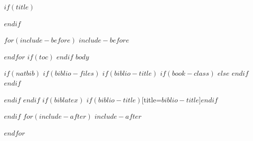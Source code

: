 \documentclass[a4paper,11pt]{article}
\newcommand\titlefont{\rm\huge\sffamily\nohang}
\begin{document}
\thispagestyle{empty}
$if(title)$
\begin{center}

\vspace{1em}
{\titlefont{$title$}}

\vspace{2em}
{\large{}}

\vspace{1em}
\end{center}
$endif$

$for(include-before)$
$include-before$

$endfor$
$if(toc)$
{
\hypersetup{linkcolor=black}
\setcounter{tocdepth}{$toc-depth$}
\tableofcontents
}
$endif$
$body$

$if(natbib)$
$if(biblio-files)$
$if(biblio-title)$
$if(book-class)$
\renewcommand\bibname{$biblio-title$}
$else$
\renewcommand\refname{$biblio-title$}
$endif$
$endif$


$endif$
$endif$
$if(biblatex)$
\printbibliography$if(biblio-title)$[title=$biblio-title$]$endif$

$endif$
$for(include-after)$
$include-after$

$endfor$
\end{document}
